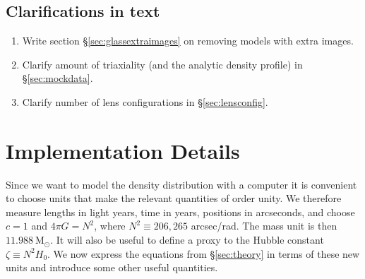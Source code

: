 \documentclass[galley,usenatbib]{mn2e}
\newcommand{\Msun}{\ensuremath{\mathrm{M}_\odot}}
\newcommand{\secref}[1] {\S\ref{#1}}
\begin{document}
\subsection{Clarifications in text}

\begin{enumerate} 

\item Write section \S\ref{sec:glassextraimages} on removing models
  with extra images.

\item Clarify amount of triaxiality (and the analytic density profile)
  in \S\ref{sec:mockdata}.

\item Clarify number of lens configurations in \S\ref{sec:lensconfig}.

\end{enumerate}


\appendix

\section{Implementation Details}

Since we want to model the density distribution with a computer it
is convenient to choose units that make the relevant quantities of order
unity.  We therefore measure lengths in light years, time in years, positions
in arcseconds, and choose $c=1$ and $4\pi G = N^2$, where $N^2 \equiv 206,265$
arcsec/rad. The mass unit is then $11.988\ \Msun$. It will also be useful to
define a proxy to the Hubble constant $\zeta \equiv N^2 H_0$. We now 
express the equations from \secref{sec:theory} in terms of these new units
and introduce some other useful quantities.
\end{document}

